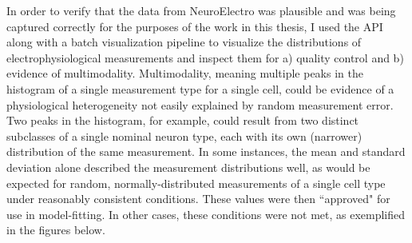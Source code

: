 In order to verify that the data from NeuroElectro was plausible and was being captured correctly for the purposes of the work in this thesis, I used the API along with a batch visualization pipeline to visualize the distributions of electrophysiological measurements and inspect them for a) quality control and b) evidence of multimodality.
Multimodality, meaning multiple peaks in the histogram of a single measurement type for a single cell, could be evidence of a physiological heterogeneity not easily explained by random measurement error.
Two peaks in the histogram, for example, could result from two distinct subclasses of a single nominal neuron type, each with its own (narrower) distribution of the same measurement.
In some instances, the mean and standard deviation alone described the measurement distributions well, as would be expected for random, normally-distributed measurements of a single cell type under reasonably consistent conditions.
These values were then ``approved" for use in model-fitting.
In other cases, these conditions were not met, as exemplified in the figures below.


%

%    
%
%
%

